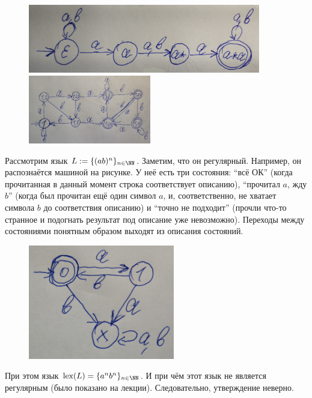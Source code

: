 \documentclass[12pt,a4paper]{article}
\newcommand{\lex}{\mathrm{lex}}
\begin{document}
    \begin{problem}{4}\ 
        \begin{figure}[H]
            \centering
            \includegraphics[height=3cm]{TI-HW-002-5.jpg}
            \includegraphics[height=3cm]{TI-HW-002-6.jpg}
        \end{figure}
    \end{problem}

    \begin{problem}{5}
        Рассмотрим язык $L := \{(ab)^n\}_{n \in \NN}$. Заметим, что он регулярный. Например, он распознаётся машиной на рисунке. У неё есть три состояния: ``всё ОК'' (когда прочитанная в данный момент строка соответствует описанию), ``прочитал $a$, жду $b$'' (когда был прочитан ещё один символ $a$, и, соответственно, не хватает символа $b$ до соответствия описанию) и ``точно не подходит'' (прочли что-то странное и подогнать результат под описание уже невозможно). Переходы между состояниями понятным образом выходят из описания состояний.
        \begin{figure}[H]
            \centering
            \includegraphics[height=5cm]{TI-HW-002-7.jpg}
        \end{figure}

        При этом язык $\lex(L) = \{a^n b^n\}_{n \in \NN}$. И при чём этот язык не является регулярным (было показано на лекции). Следовательно, утверждение неверно.
    \end{problem}
\end{document}
